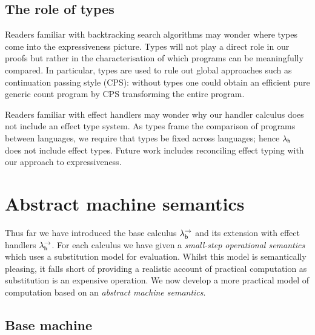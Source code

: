 \documentclass[12pt,phd,lfcs,twoside,openright,logo,leftchapter,normalheadings]{infthesis}
\theoremstyle{plain}
\theoremstyle{definition}
\begin{document}
\subsection{The role of types}

Readers familiar with backtracking search algorithms may wonder where
types come into the expressiveness picture.
%
Types will not play a direct role in our proofs but rather in the
characterisation of which programs can be meaningfully compared. In
particular, types are used to rule out global approaches such as
continuation passing style (CPS): without types one could obtain an
efficient pure generic count program by CPS transforming the entire
program.

Readers familiar with effect handlers may wonder why our handler
calculus does not include an effect type system.
%
As types frame the comparison of programs between languages, we
require that types be fixed across languages; hence $\lambda_{\mathsf{h}}$ does not
include effect types.
%
Future work includes reconciling effect typing with our approach to
expressiveness.

\section{Abstract machine semantics}
\label{sec:abstract-machine-semantics}
Thus far we have introduced the base calculus $\lambda^\rightarrow_{\mathsf{b}}$ and its
extension with effect handlers $\lambda^\rightarrow_{\mathsf{h}}$.
%
For each calculus we have given a \emph{small-step operational
  semantics} which uses a substitution model for evaluation. Whilst
this model is semantically pleasing, it falls short of providing a
realistic account of practical computation as substitution is an
expensive operation. We now develop a more practical model of
computation based on an \emph{abstract machine semantics}.

\subsection{Base machine}
\label{sec:base-abstract-machine}

\newcommand{\Conf}{\dec{Conf}}
\newcommand{\EConf}{\dec{EConf}}
\newcommand{\MVal}{\dec{MVal}}
\end{document}
